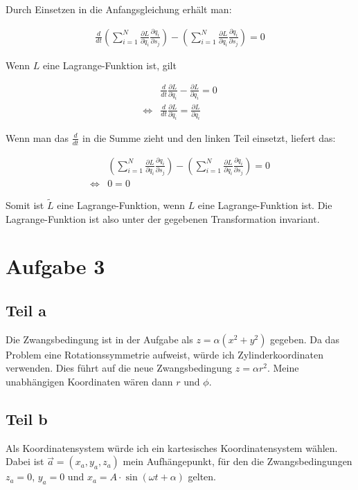 \documentclass[a4paper,german,12pt,smallheadings]{scrartcl}
\begin{document}
Durch Einsetzen in die Anfangsgleichung erhält man:

\begin{align*}
\frac{d}{dt} \left(
  \sum_{i=1}^N \frac{\partial L}{\partial \dot{q}_i} \frac{\partial q_i}{\partial s_j}
\right) - \left(
  \sum_{i=1}^N \frac{\partial L}{\partial q_i} \frac{\partial q_i}{\partial s_j}
\right) = 0
\end{align*}

Wenn $L$ eine Lagrange-Funktion ist, gilt

\begin{align*}
  &\frac{d}{dt}\frac{\partial L}{\partial \dot{q}_i} - \frac{\partial L}{\partial q_i} = 0 \\
  \Leftrightarrow &\frac{d}{dt}\frac{\partial L}{\partial \dot{q}_i} = \frac{\partial L}{\partial q_i}
\end{align*}

Wenn man das $\frac{d}{dt}$ in die Summe zieht und den linken Teil einsetzt, liefert das:

\begin{align*}
&\left(
  \sum_{i=1}^N \frac{\partial L}{\partial q_i} \frac{\partial q_i}{\partial s_j}
\right) - \left(
  \sum_{i=1}^N \frac{\partial L}{\partial q_i} \frac{\partial q_i}{\partial s_j}
\right) = 0 \\
\Leftrightarrow &0 = 0
\end{align*}

Somit ist $\tilde{L}$ eine Lagrange-Funktion, wenn $L$ eine Lagrange-Funktion
ist. Die Lagrange-Funktion ist also unter der gegebenen Transformation
invariant.

\section*{Aufgabe 3}
\subsection*{Teil a}

Die Zwangsbedingung ist in der Aufgabe als $z = \alpha (x^2+y^2)$ gegeben. Da
das Problem eine Rotationssymmetrie aufweist, würde ich Zylinderkoordinaten
verwenden. Dies führt auf die neue Zwangsbedingung $z = \alpha r^2$. Meine
unabhängigen Koordinaten wären dann $r$ und $\phi$.

\subsection*{Teil b}
Als Koordinatensystem würde ich ein kartesisches Koordinatensystem wählen.
Dabei ist $\vec{a} = (x_a, y_a, z_a)$ mein Aufhängepunkt, für den die
Zwangsbedingungen $z_a = 0$, $y_a = 0$ und $x_a = A \cdot \sin (\omega t +
\alpha)$ gelten.
\end{document}
